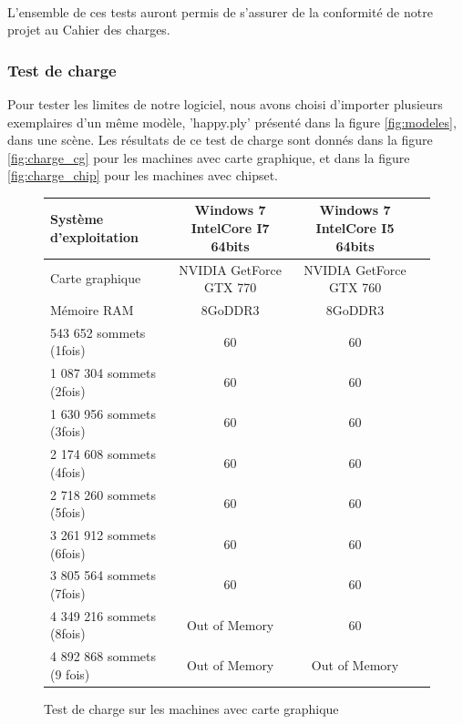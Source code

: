 \paragraph{}
L'ensemble de ces tests auront permis de s'assurer de la conformité de notre projet au Cahier des charges. 

\subsubsection{Test de charge}
Pour tester les limites de notre logiciel, nous avons choisi d'importer plusieurs exemplaires d'un même modèle, 'happy.ply' présenté dans la figure \ref{fig:modeles}, dans une scène. Les résultats de ce test de charge sont donnés dans la figure \ref{fig:charge_cg} pour les machines avec carte graphique, et dans la figure \ref{fig:charge_chip} pour les machines avec chipset.

\begin{figure}[h]
  \begin{changemargin}{-4cm}{-4cm}
    \centering
    \begin{tabular}{|l|c|c|c|}
      \hline
      Système d'exploitation & Windows 7 IntelCore I7 64bits & Windows 7 IntelCore I5 64bits \\ \hline
      Carte graphique &  NVIDIA GetForce GTX 770 & NVIDIA GetForce GTX 760\\ \hline
      Mémoire RAM & 8GoDDR3 & 8GoDDR3 \\ \hline \hline
      543 652 sommets (1fois) & 60 & 60 \\ \hline
      1 087 304 sommets (2fois) & 60 & 60 \\ \hline
      1 630 956 sommets (3fois) & 60 & 60 \\ \hline
      2 174 608 sommets (4fois) & 60 & 60 \\ \hline
      2 718 260 sommets (5fois) & 60 & 60 \\ \hline
      3 261 912 sommets (6fois) & 60 & 60 \\ \hline
      3 805 564 sommets (7fois) & 60 & 60 \\ \hline
      4 349 216 sommets (8fois) & Out of Memory & 60 \\ \hline
      4 892 868 sommets (9 fois) & Out of Memory & Out of Memory \\ \hline
    \end{tabular}
  \end{changemargin}
  \caption{Test de charge sur les machines avec carte graphique}
  \label{tab:fps_cg}
\end{figure}

